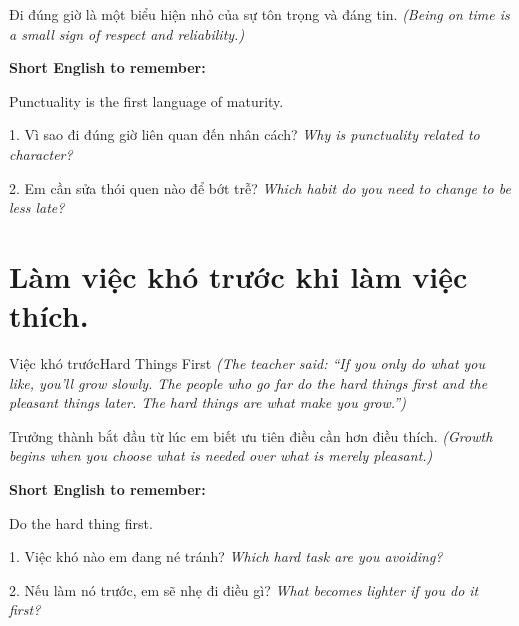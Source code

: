 \begin{baihoc}
Đi đúng giờ là một biểu hiện nhỏ của sự tôn trọng và đáng tin.
\textit{(Being on time is a small sign of respect and reliability.)}
\end{baihoc}

\begin{ghinhoanh}
\textbf{Short English to remember:}

Punctuality is the first language of maturity.

\end{ghinhoanh}

\begin{tuhocnhanh}
1. Vì sao đi đúng giờ liên quan đến nhân cách? \textit{Why is punctuality related to character?}

2. Em cần sửa thói quen nào để bớt trễ? \textit{Which habit do you need to change to be less late?}
\end{tuhocnhanh}
\ngancach

\section{Làm việc khó trước khi làm việc thích.}
\begin{truyen}{Việc khó trước}{Hard Things First}
\textit{(The teacher said: ``If you only do what you like, you'll grow slowly. The people who go far do the hard things first and the pleasant things later. The hard things are what make you grow.'')}
\end{truyen}

\begin{baihoc}
Trưởng thành bắt đầu từ lúc em biết ưu tiên điều cần hơn điều thích.
\textit{(Growth begins when you choose what is needed over what is merely pleasant.)}
\end{baihoc}

\begin{ghinhoanh}
\textbf{Short English to remember:}

Do the hard thing first.

\end{ghinhoanh}

\begin{tuhocnhanh}
1. Việc khó nào em đang né tránh? \textit{Which hard task are you avoiding?}

2. Nếu làm nó trước, em sẽ nhẹ đi điều gì? \textit{What becomes lighter if you do it first?}
\end{tuhocnhanh}
\ngancach

